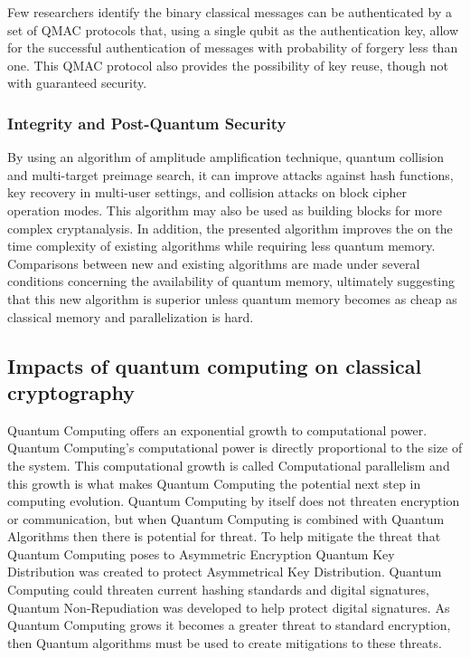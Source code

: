 \documentclass[sigconf]{acmart}
\begin{document}
Few researchers identify the binary classical messages can be authenticated by a set of QMAC protocols that, using a single qubit as the authentication key, allow for the successful authentication of messages with probability of forgery less than one. This QMAC protocol also provides the possibility of key reuse, though not with guaranteed security\cite{curty_quantum_2001}.


\subsubsection{Integrity and Post-Quantum Security} %
By using an algorithm of amplitude amplification technique, quantum collision and multi-target preimage search, it can improve attacks against hash functions, key recovery in multi-user settings, and collision attacks on block cipher operation modes. This algorithm may also be used as building blocks for more complex cryptanalysis. In addition, the presented algorithm improves the on the time complexity of existing algorithms while requiring less quantum memory. Comparisons between new and existing algorithms are made under several conditions concerning the availability of quantum memory, ultimately suggesting that this new algorithm is superior unless quantum memory becomes as cheap as classical memory and parallelization is hard\cite{chailloux_efficient_2017}.


\subsection{Impacts of quantum computing on classical cryptography}
Quantum Computing offers an exponential growth to computational power. Quantum Computing’s computational power is directly proportional to the size of the system. This computational growth is called Computational parallelism and this growth is what makes Quantum Computing the potential next step in computing evolution. Quantum Computing by itself does not threaten encryption or communication, but when Quantum Computing is combined with Quantum Algorithms then there is potential for threat. To help mitigate the threat that Quantum Computing poses to Asymmetric Encryption Quantum Key Distribution was created to protect Asymmetrical Key Distribution. Quantum Computing could threaten current hashing standards and digital signatures, Quantum Non-Repudiation was developed to help protect digital signatures. As Quantum Computing grows it becomes a greater threat to standard encryption, then Quantum algorithms must be used to create mitigations to these threats.
\end{document}
